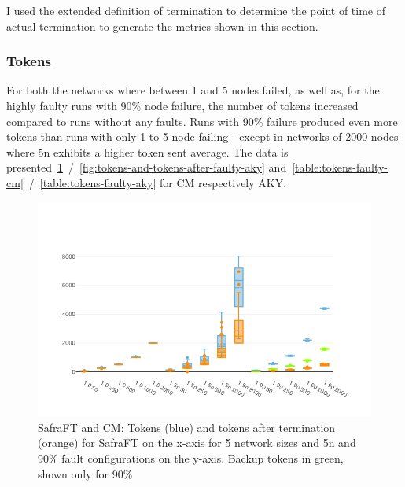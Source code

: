 I used the extended definition of termination to determine the point of time of actual termination to generate the metrics shown in this section.

\subsubsection{Tokens}
\label{ssec:tokens-faulty}
For both the networks where between 1 and 5 nodes failed, as well as, for the highly faulty runs with 90\% node failure, the number of tokens increased compared to runs without any faults.
Runs with 90\% failure produced even more tokens than runs with only 1 to 5 node failing - except in networks of 2000 nodes where 5n exhibits a higher token sent average.
The data is presented~\cref{fig:tokens-and-tokens-after-faulty-cm}~/~\ref{fig:tokens-and-tokens-after-faulty-aky} and~\cref{table:tokens-faulty-cm}~/~\ref{table:tokens-faulty-aky} for CM respectively AKY.

\begin{figure}
	\includegraphics{figures/tokens-and-tokens-after-faulty-cm.png}
	\caption{SafraFT and CM: Tokens (blue) and tokens after termination (orange) for SafraFT on the x-axis for 5 network sizes and 5n and 90\% fault configurations on the y-axis.        Backup tokens in green, shown only for 90\%}
	\label{fig:tokens-and-tokens-after-faulty-cm}
\end{figure}



